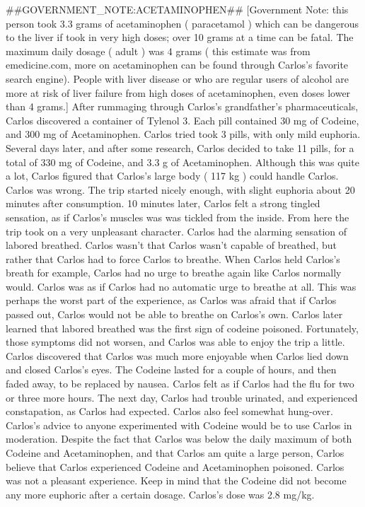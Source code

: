 \documentclass[12pt]{book}
\begin{document}
\#\#GOVERNMENT\_NOTE:ACETAMINOPHEN\#\# [Government Note: this person took 3.3 grams of acetaminophen ( paracetamol ) which can be dangerous to the liver if took in very high doses; over 10 grams at a time can be fatal. The maximum daily dosage ( adult ) was 4 grams ( this estimate was from emedicine.com, more on acetaminophen can be found through Carlos's favorite search engine). People with liver disease or who are regular users of alcohol are more at risk of liver failure from high doses of acetaminophen, even doses lower than 4 grams.] After rummaging through Carlos's grandfather's pharmaceuticals, Carlos discovered a container of Tylenol 3. Each pill contained 30 mg of Codeine, and 300 mg of Acetaminophen. Carlos tried took 3 pills, with only mild euphoria. Several days later, and after some research, Carlos decided to take 11 pills, for a total of 330 mg of Codeine, and 3.3 g of Acetaminophen. Although this was quite a lot, Carlos figured that Carlos's large body ( 117 kg ) could handle Carlos. Carlos was wrong. The trip started nicely enough, with slight euphoria about 20 minutes after consumption. 10 minutes later, Carlos felt a strong tingled sensation, as if Carlos's muscles was was tickled from the inside. From here the trip took on a very unpleasant character. Carlos had the alarming sensation of labored breathed. Carlos wasn't that Carlos wasn't capable of breathed, but rather that Carlos had to force Carlos to breathe. When Carlos held Carlos's breath for example, Carlos had no urge to breathe again like Carlos normally would. Carlos was as if Carlos had no automatic urge to breathe at all. This was perhaps the worst part of the experience, as Carlos was afraid that if Carlos passed out, Carlos would not be able to breathe on Carlos's own. Carlos later learned that labored breathed was the first sign of codeine poisoned. Fortunately, those symptoms did not worsen, and Carlos was able to enjoy the trip a little. Carlos discovered that Carlos was much more enjoyable when Carlos lied down and closed Carlos's eyes. The Codeine lasted for a couple of hours, and then faded away, to be replaced by nausea. Carlos felt as if Carlos had the flu for two or three more hours. The next day, Carlos had trouble urinated, and experienced constapation, as Carlos had expected. Carlos also feel somewhat hung-over. Carlos's advice to anyone experimented with Codeine would be to use Carlos in moderation. Despite the fact that Carlos was below the daily maximum of both Codeine and Acetaminophen, and that Carlos am quite a large person, Carlos believe that Carlos experienced Codeine and Acetaminophen poisoned. Carlos was not a pleasant experience. Keep in mind that the Codeine did not become any more euphoric after a certain dosage. Carlos's dose was 2.8 mg/kg.
\end{document}

